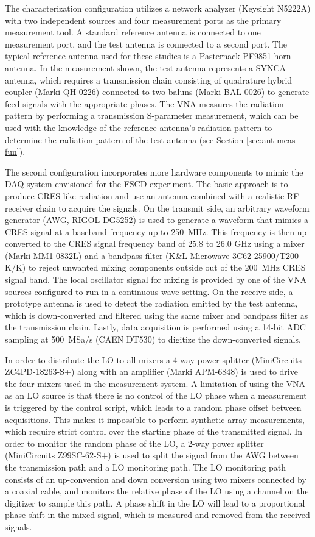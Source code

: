 The characterization configuration utilizes a network analyzer (Keysight N5222A) with two independent sources and four measurement ports as the primary measurement tool. A standard reference antenna is connected to one measurement port, and the test antenna is connected to a second port. The typical reference antenna used for these studies is a Pasternack PF9851 horn antenna. In the measurement shown, the test antenna represents a SYNCA antenna, which requires a transmission chain consisting of quadrature hybrid coupler (Marki QH-0226) connected to two baluns (Marki BAL-0026) to generate feed signals with the appropriate phases. The VNA measures the radiation pattern by performing a transmission S-parameter measurement, which can be used with the knowledge of the reference antenna's radiation pattern to determine the radiation pattern of the test antenna (see Section \ref{sec:ant-meas-fun}).

The second configuration incorporates more hardware components to mimic the DAQ system envisioned for the FSCD experiment. The basic approach is to produce CRES-like radiation and use an antenna combined with a realistic RF receiver chain to acquire the signals. On the transmit side, an arbitrary waveform generator (AWG, RIGOL DG5252) is used to generate a waveform that mimics a CRES signal at a baseband frequency up to 250~MHz. This frequency is then up-converted to the CRES signal frequency band of 25.8 to 26.0 GHz using a mixer (Marki MM1-0832L) and a bandpass filter (K\&L Microwave 3C62-25900/T200-K/K) to reject unwanted mixing components outside out of the 200~MHz CRES signal band. The local oscillator signal for mixing is provided by one of the VNA sources configured to run in a continuous wave setting. On the receive side, a prototype antenna is used to detect the radiation emitted by the test antenna, which is down-converted and filtered using the same mixer and bandpass filter as the transmission chain. Lastly, data acquisition is performed using a 14-bit ADC sampling at 500~MSa/s (CAEN DT530) to digitize the down-converted signals.

In order to distribute the LO to all mixers a 4-way power splitter (MiniCircuits ZC4PD-18263-S+) along with an amplifier (Marki APM-6848) is used to drive the four mixers used in the measurement system. A limitation of using the VNA as an LO source is that there is no control of the LO phase when a measurement is triggered by the control script, which leads to a random phase offset between acquisitions. This makes it impossible to perform synthetic array measurements, which require strict control over the starting phase of the transmitted signal. In order to monitor the random phase of the LO, a 2-way power splitter (MiniCircuits Z99SC-62-S+) is used to split the signal from the AWG between the transmission path and a LO monitoring path. The LO monitoring path consists of an up-conversion and down conversion using two mixers connected by a coaxial cable, and monitors the relative phase of the LO using a channel on the digitizer to sample this path. A phase shift in the LO will lead to a proportional phase shift in the mixed signal, which is measured and removed from the received signals.


